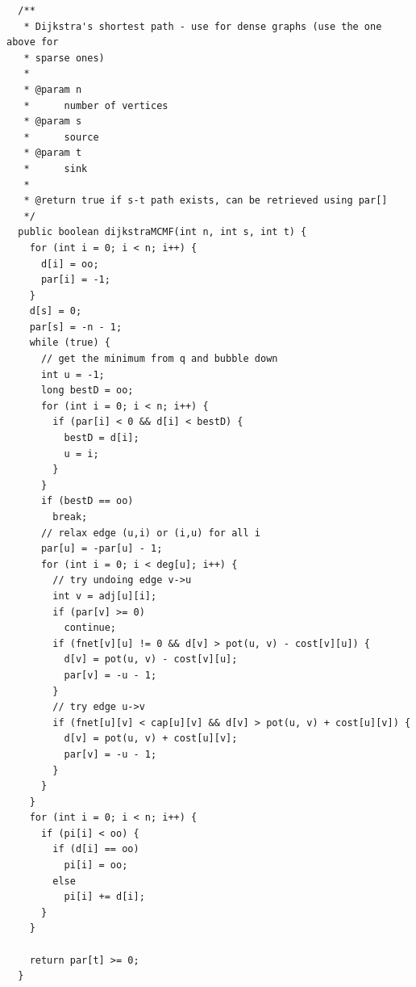\documentclass{article}
\begin{document}
  \begin{verbatim}
  /**
   * Dijkstra's shortest path - use for dense graphs (use the one above for
   * sparse ones)
   * 
   * @param n
   *      number of vertices
   * @param s
   *      source
   * @param t
   *      sink
   * 
   * @return true if s-t path exists, can be retrieved using par[]
   */
  public boolean dijkstraMCMF(int n, int s, int t) {
    for (int i = 0; i < n; i++) {
      d[i] = oo;
      par[i] = -1;
    }
    d[s] = 0;
    par[s] = -n - 1;
    while (true) {
      // get the minimum from q and bubble down
      int u = -1;
      long bestD = oo;
      for (int i = 0; i < n; i++) {
        if (par[i] < 0 && d[i] < bestD) {
          bestD = d[i];
          u = i;
        }
      }
      if (bestD == oo)
        break;
      // relax edge (u,i) or (i,u) for all i
      par[u] = -par[u] - 1;
      for (int i = 0; i < deg[u]; i++) {
        // try undoing edge v->u
        int v = adj[u][i];
        if (par[v] >= 0)
          continue;
        if (fnet[v][u] != 0 && d[v] > pot(u, v) - cost[v][u]) {
          d[v] = pot(u, v) - cost[v][u];
          par[v] = -u - 1;
        }
        // try edge u->v
        if (fnet[u][v] < cap[u][v] && d[v] > pot(u, v) + cost[u][v]) {
          d[v] = pot(u, v) + cost[u][v];
          par[v] = -u - 1;
        }
      }
    }
    for (int i = 0; i < n; i++) {
      if (pi[i] < oo) {
        if (d[i] == oo)
          pi[i] = oo;
        else
          pi[i] += d[i];
      }
    }

    return par[t] >= 0;
  }

    \end{verbatim}
\end{document}
